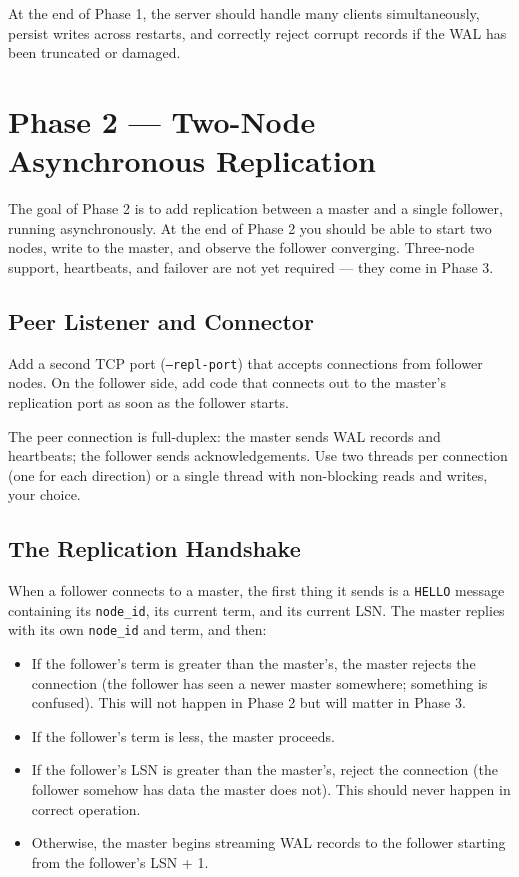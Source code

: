\documentclass[11pt,a4paper]{article}
\begin{document}
At the end of Phase 1, the server should handle many clients simultaneously, persist writes across restarts, and correctly reject corrupt records if the WAL has been truncated or damaged.

\section{Phase 2 --- Two-Node Asynchronous Replication}

The goal of Phase 2 is to add replication between a master and a single follower, running asynchronously. At the end of Phase 2 you should be able to start two nodes, write to the master, and observe the follower converging. Three-node support, heartbeats, and failover are not yet required --- they come in Phase 3.

\subsection{Peer Listener and Connector}
Add a second TCP port (\texttt{--repl-port}) that accepts connections from follower nodes. On the follower side, add code that connects out to the master's replication port as soon as the follower starts.

The peer connection is full-duplex: the master sends WAL records and heartbeats; the follower sends acknowledgements. Use two threads per connection (one for each direction) or a single thread with non-blocking reads and writes, your choice.

\subsection{The Replication Handshake}
When a follower connects to a master, the first thing it sends is a \texttt{HELLO} message containing its \texttt{node\_id}, its current term, and its current LSN. The master replies with its own \texttt{node\_id} and term, and then:

\begin{itemize}
\item If the follower's term is greater than the master's, the master rejects the connection (the follower has seen a newer master somewhere; something is confused). This will not happen in Phase 2 but will matter in Phase 3.
\item If the follower's term is less, the master proceeds.
\item If the follower's LSN is greater than the master's, reject the connection (the follower somehow has data the master does not). This should never happen in correct operation.
\item Otherwise, the master begins streaming WAL records to the follower starting from the follower's LSN + 1.
\end{itemize}
\end{document}
